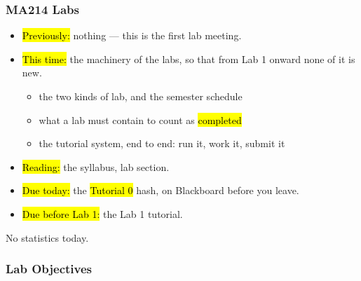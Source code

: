 

\begin{frame}
\frametitle{MA214 Labs}
    \begin{itemize}
    \item \hl{Previously:} nothing --- this is the first lab meeting.
    \item \hl{This time:} the machinery of the labs, so that from Lab 1
      onward none of it is new.
      \begin{itemize}
      \item the two kinds of lab, and the semester schedule
      \item what a lab must contain to count as \hl{completed}
      \item the tutorial system, end to end: run it, work it, submit it
      \end{itemize}
    \item \hl{Reading:} the syllabus, lab section.
    \item \hl{Due today:} the \hl{Tutorial 0} hash, on Blackboard before you leave.
    \item \hl{Due before Lab 1:} the Lab 1 tutorial.
    \end{itemize}

\vspace{0.4em}
No statistics today.
\end{frame}


\begin{frame}
    \frametitle{Lab Objectives}
\end{frame}
